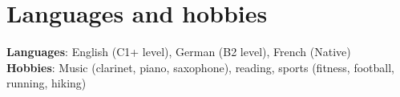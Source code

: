 \documentclass[letterpaper,11pt]{article}
\begin{document}
\section{Languages and hobbies}
 \begin{itemize}[leftmargin=0.15in, label={}]
    \small{\item{
     \textbf{Languages}{: English (C1+ level), German (B2 level), French (Native)} \\
     \textbf{Hobbies}{: Music (clarinet, piano, saxophone), reading, sports (fitness, football, running, hiking)} \\
    }}
 \end{itemize}


\end{document}

